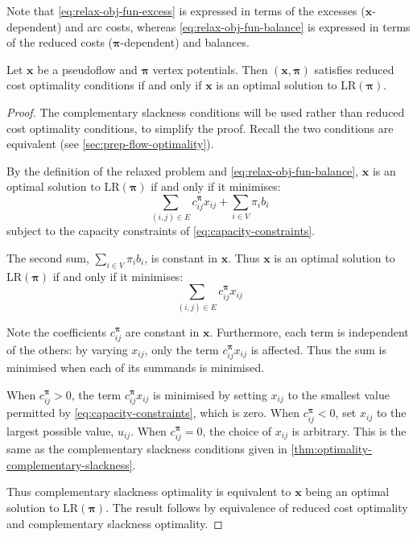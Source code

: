 \begin{remark}
Note that \cref{eq:relax-obj-fun-excess} is expressed in terms of the excesses ($\mathbf{x}$-dependent) and arc costs, whereas \cref{eq:relax-obj-fun-balance} is expressed in terms of the reduced costs ($\boldsymbol{\pi}$-dependent) and balances.\\
\end{remark}

\begin{lemma} \label{lemma:relax-rc-lr-equivalence}
Let $\mathbf{x}$ be a pseudoflow and $\boldsymbol{\pi}$ vertex potentials. Then $\left(\mathbf{x},\boldsymbol{\pi}\right)$ satisfies reduced cost optimality conditions if and only if $\mathbf{x}$ is an optimal solution to $\mathrm{LR}(\boldsymbol{\pi})$.
\end{lemma}
\begin{proof}
The complementary slackness conditions will be used rather than reduced cost optimality conditions, to simplify the proof. Recall the two conditions are equivalent (see \cref{sec:prep-flow-optimality}).

By the definition of the relaxed problem and  \cref{eq:relax-obj-fun-balance}, $\mathbf{x}$ is an optimal solution to $\mathrm{LR}(\boldsymbol{\pi})$ if and only if it minimises:
\[\sum_{\left(i,j\right)\in E}c_{ij}^{\boldsymbol{\pi}}x_{ij}+\sum_{i\in V}\pi_{i}b_{i}\]
subject to the capacity constraints of \cref{eq:capacity-constraints}.

The second sum, $\sum_{i \in V} \pi_i b_i$, is constant in $\mathbf{x}$. Thus $\mathbf{x}$ is an optimal solution to $\mathrm{LR}(\boldsymbol{\pi})$ if and only if it minimises:
\[\sum_{\left(i,j\right)\in E}c_{ij}^{\boldsymbol{\pi}}x_{ij}\]

Note the coefficients $c_{ij}^{\boldsymbol{\pi}}$ are constant in $\mathbf{x}$. Furthermore, each term is independent of the others: by varying $x_{ij}$, only the term $c_{ij}^{\boldsymbol{\pi}}x_{ij}$ is affected\footnotemark. Thus the sum is minimised when each of its summands is minimised.

When $c_{ij}^{\boldsymbol{\pi}}>0$, the term $c_{ij}^{\boldsymbol{\pi}}x_{ij}$ is minimised by setting $x_{ij}$ to the smallest value permitted by \cref{eq:capacity-constraints}, which is zero. When $c_{ij}^{\boldsymbol{\pi}}<0$, set $x_{ij}$ to the largest possible value, $u_{ij}$. When $c_{ij}^{\boldsymbol{\pi}}=0$, the choice of $x_{ij}$ is arbitrary. This is the same as the complementary slackness conditions given in \cref{thm:optimality-complementary-slackness}. 

Thus complementary slackness optimality is equivalent to $\mathbf{x}$ being an optimal solution to $\mathrm{LR}(\boldsymbol{\pi})$. The result follows by equivalence of reduced cost optimality and complementary slackness optimality.
\end{proof}

